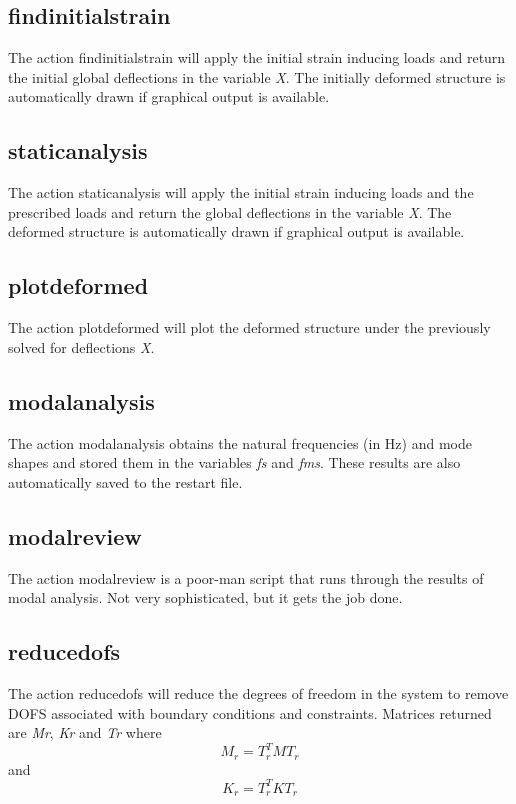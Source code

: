 \documentclass[12pt]{article}
\newcommand*{\command}[1]{\textsf{#1}}
\newcommand*{\variable}[1]{\textit{#1}}
\begin{document}
\subsection{findinitialstrain}
The action \command{findinitialstrain} will apply the initial strain inducing loads and return the initial global deflections in the variable \variable{X}. The initially deformed structure is automatically drawn if graphical output is available.
\subsection{staticanalysis}
The action \command{staticanalysis} will apply the initial strain inducing loads and the prescribed loads and return the global deflections in the variable \variable{X}. The deformed structure is automatically drawn if graphical output is available.
\subsection{plotdeformed}
The action \command{plotdeformed} will plot the deformed structure under the previously solved for deflections \variable{X}.
\subsection{modalanalysis}
The action \command{modalanalysis} obtains the natural frequencies (in Hz) and mode shapes and stored them in the variables \variable{fs} and \variable{fms}. These results are also automatically saved to the restart file.
\subsection{modalreview}
The action \command{modalreview} is a poor-man script that runs through the results of modal analysis. Not very sophisticated, but it gets the job done.
\subsection{reducedofs}
The action \command{reducedofs} will reduce the degrees of freedom in the system to remove DOFS associated with boundary conditions and constraints. Matrices returned are \variable{Mr}, \variable{Kr} and \variable{Tr} where
\begin{equation}
M_r=T_r^T M T_r
\end{equation}
\noindent and
\begin{equation}
K_r=T_r^T K T_r
\end{equation}
\end{document}
